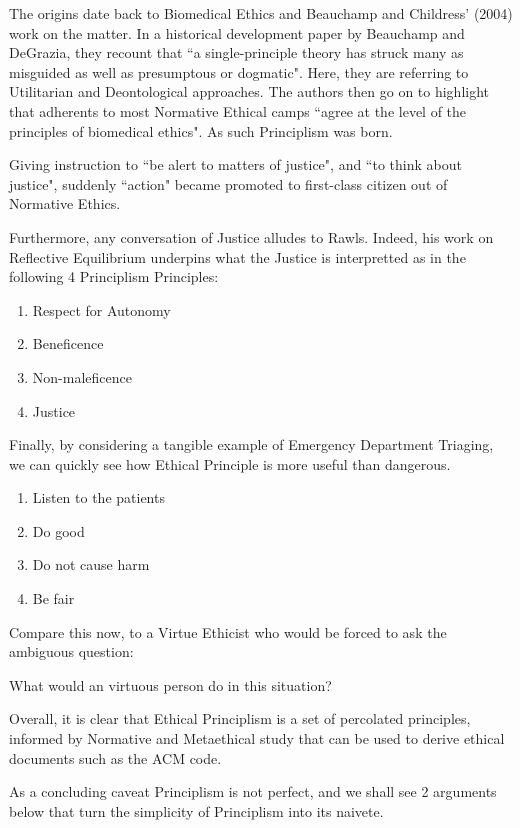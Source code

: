 \documentclass{scrartcl}
\begin{document}
The origins date back to Biomedical Ethics and Beauchamp and Childress' (2004) work on the matter. In a historical development paper by Beauchamp and DeGrazia, they recount that ``a single-principle theory has struck many as misguided as well as presumptous or dogmatic". Here, they are referring to Utilitarian and Deontological approaches. The authors then go on to highlight that adherents to most Normative Ethical camps ``agree at the level of the principles of biomedical ethics". As such Principlism was born.

Giving instruction to ``be alert to matters of justice", and ``to think about justice", suddenly ``action" became promoted to first-class citizen out of Normative Ethics.

Furthermore, any conversation of Justice alludes to Rawls. Indeed, his work on Reflective Equilibrium underpins what the Justice is interpretted as in the following 4 Principlism Principles:

\begin{enumerate}
    \item Respect for Autonomy
    \item Beneficence
    \item Non-maleficence
    \item Justice
\end{enumerate}

Finally, by considering a tangible example of Emergency Department Triaging, we can quickly see how Ethical Principle is more useful than dangerous.

\begin{enumerate}
    \item Listen to the patients
    \item Do good
    \item Do not cause harm
    \item Be fair
\end{enumerate}

Compare this now, to a Virtue Ethicist who would be forced to ask the ambiguous question:

What would an virtuous person do in this situation?

Overall, it is clear that Ethical Principlism is a set of percolated principles, informed by Normative and Metaethical study that can be used to derive ethical documents such as the ACM code.

As a concluding caveat Principlism is not perfect, and we shall see 2 arguments below that turn the simplicity of Principlism into its naivete.
\end{document}
